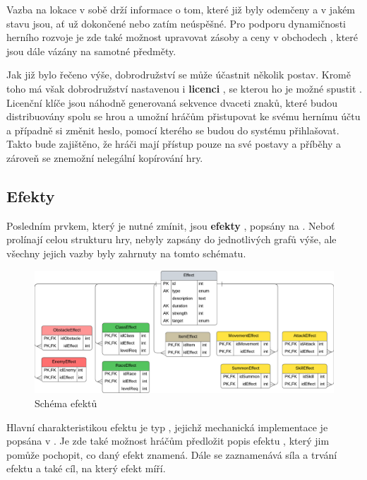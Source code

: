 Vazba na lokace  v sobě drží informace o tom, které již byly odemčeny  a v jakém stavu  jsou, ať už dokončené nebo zatím neúspěšné. Pro podporu dynamičnosti herního rozvoje je zde také možnost upravovat zásoby a ceny v obchodech , které jsou dále vázány na samotné předměty.

Jak již bylo řečeno výše, dobrodružství se může účastnit několik postav. Kromě toho má však dobrodružství nastavenou i \textbf{licenci} , se kterou ho je možné spustit . Licenční klíče jsou náhodně generovaná sekvence dvaceti znaků, které budou distribuovány spolu se hrou a umožní hráčům přistupovat ke svému hernímu účtu a případně si změnit heslo, pomocí kterého se budou do systému přihlašovat. Takto bude zajištěno, že hráči mají přístup pouze na své postavy a příběhy a zároveň se znemožní nelegální kopírování hry.


\subsection{Efekty}
\label{subsec:schema_effect}

Posledním prvkem, který je nutné zmínit, jsou \textbf{efekty} , popsány na . Neboť prolínají celou strukturu hry, nebyly zapsány do jednotlivých grafů výše, ale všechny jejich vazby byly zahrnuty na tomto schématu. 

\begin{figure}[h]
    \centering
    \includegraphics[width=\textwidth]{../../shared/diagrams/er_effect.pdf}
    \caption{Schéma efektů}
    \label{diag:er_effect}
\end{figure}

Hlavní charakteristikou efektu je typ , jejichž mechanická implementace je popsána v . Je zde také možnost hráčům předložit popis efektu , který jim pomůže pochopit, co daný efekt znamená. Dále se zaznamenává síla a trvání efektu a také cíl, na který efekt míří.

